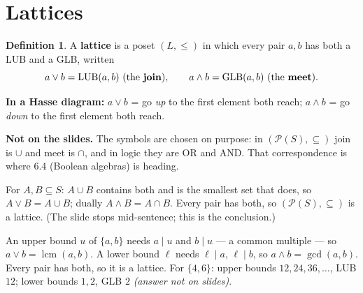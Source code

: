 \documentclass{fkt-notes}
\DeclareMathOperator{\lcm}{lcm}
\newcommand{\notslides}[1]{\par\noindent\textbf{Not on the slides.} #1\par}
\newcommand{\src}[1]{\par\noindent{\small\itshape Source: #1}\par\smallskip}
\newcommand{\kolman}[1]{\setcounter{section}{\numexpr#1-1\relax}}
\theoremstyle{definition}
\newtheorem*{defn}{Definition}
\begin{document}
\kolman{3}
\section{Lattices}\src{Kolman 6.3}
%

\begin{defn}
  A \textbf{lattice} is a poset $(L,\le)$ in which every pair $a,b$ has
  both a LUB and a GLB, written
  \[
    a\vee b=\mathrm{LUB}(a,b)\ \text{(the \textbf{join})},\qquad
    a\wedge b=\mathrm{GLB}(a,b)\ \text{(the \textbf{meet})}.
  \]
\end{defn}
\textbf{In a Hasse diagram:} $a\vee b$ = go \emph{up} to the first
element both reach; $a\wedge b$ = go \emph{down} to the first element
both reach.
\notslides{The symbols are chosen on purpose: in $(\mathcal P(S),\subseteq)$
  join is $\cup$ and meet is $\cap$, and in logic they are OR and AND.
  That correspondence is where 6.4 (Boolean algebras) is heading.}

\begin{example}
  For $A,B\subseteq S$: $A\cup B$ contains both and is the smallest set
  that does, so $A\vee B=A\cup B$; dually $A\wedge B=A\cap B$. Every
  pair has both, so $(\mathcal P(S),\subseteq)$ is a lattice. (The slide
  stops mid-sentence; this is the conclusion.)
\end{example}

\begin{example}[Ex.~2: $(\Z^+,\mid)$]
  An upper bound $u$ of $\{a,b\}$ needs $a\mid u$ and $b\mid u$ --- a
  common multiple --- so $a\vee b=\lcm(a,b)$. A lower bound $\ell$ needs
  $\ell\mid a$, $\ell\mid b$, so $a\wedge b=\gcd(a,b)$. Every pair has
  both, so it is a lattice. For $\{4,6\}$: upper bounds
  $12,24,36,\dots$, LUB $12$; lower bounds $1,2$, GLB $2$ \emph{(answer
    not on slides)}.
\end{example}
\end{document}
